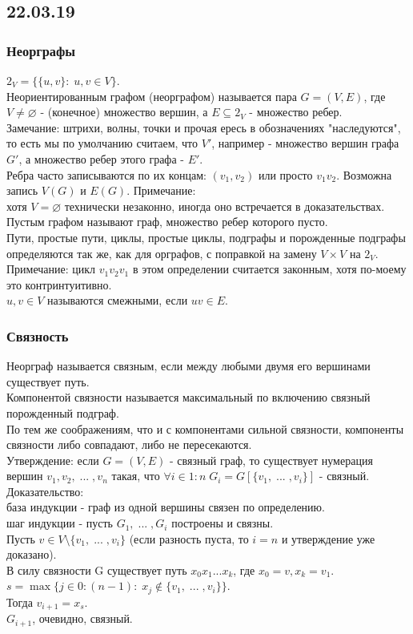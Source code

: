 \subsection{22.03.19}
\subsubsection{Неорграфы}
$2_V = \{\{u, v\}: \; u, v \in V\}$.\\
Неориентированным графом (неорграфом) называется пара $G = (V, E)$, где $V \not= \varnothing$ - (конечное) множество вершин, а $E \subseteq 2_V$ - множество ребер.\\
Замечание: штрихи, волны, точки и прочая ересь в обозначениях "наследуются", то есть мы по умолчанию считаем, что $V'$, например - множество вершин графа $G'$, а множество ребер этого графа - $E'$.\\
Ребра часто записываются по их концам: $(v_1, v_2)$ или просто $v_1v_2$.
Возможна запись $V(G)$ и $E(G)$.
Примечание: \\
хотя $V = \varnothing$ технически незаконно, иногда оно встречается в доказательствах.\\
Пустым графом называют граф, множество ребер которого пусто.\\
Пути, простые пути, циклы, простые циклы, подграфы и порожденные подграфы определяются так же, как для орграфов, с поправкой на замену $V \times V$ на $2_V$.\\
Примечание: цикл $v_1v_2v_1$ в этом определении считается законным, хотя по-моему это контринтуитивно.\\
$u, v \in V$ называются смежными, если $uv \in E$.
\subsubsection{Связность}
Неорграф называется связным, если между любыми двумя его вершинами существует путь.\\
Компонентой связности называется максимальный по включению связный порожденный подграф.\\
По тем же соображениям, что и с компонентами сильной связности, компоненты связности либо совпадают, либо не пересекаются.\\
Утверждение: если $G = (V, E)$ - связный граф, то существует нумерация вершин $v_1, v_2, \; ... \; , v_n$ такая, что $\forall i \in 1:n \; G_i = G[\{v_1, \; ... \; , v_i\}]$ - связный.\\
Доказательство:\\
база индукции - граф из одной вершины связен по определению.\\
шаг индукции - пусть $G_1, \; ... \; , G_i$ построены и связны.\\
Пусть $v \in V \setminus \{v_1, \; ... \; , v_i\}$ (если разность пуста, то $i = n$ и утверждение уже доказано).\\
В силу связности G существует путь $x_0x_1...x_k$, где $x_0 = v, x_k = v_1$.\\
$s = \max\{j \in 0:(n - 1) : \; x_j \not\in \{v_1,\;...\;, v_i\}\}$.\\
Тогда $v_{i + 1} = x_s$.\\
$G_{i + 1}$, очевидно, связный.
